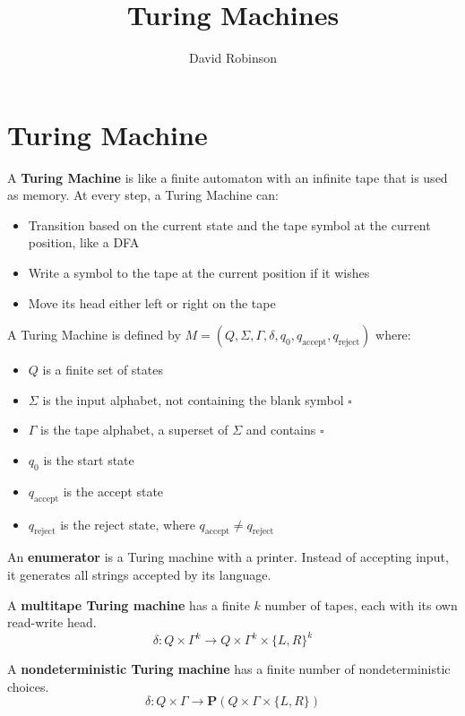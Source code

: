 \documentclass{article}
\title{Turing Machines}
\author{David Robinson}
\date{}
\begin{document}
\maketitle

\section*{Turing Machine}

A \textbf{Turing Machine} is like a finite automaton with an infinite tape that is used as memory. At every step, a Turing Machine can:
\begin{itemize}
    \item Transition based on the current state and the tape symbol at the current position, like a DFA
    \item Write a symbol to the tape at the current position if it wishes
    \item Move its head either left or right on the tape
\end{itemize}

A Turing Machine is defined by $M=(Q,\Sigma,\Gamma,\delta,q_0, q_\text{accept}, q_\text{reject})$ where:
\begin{itemize}
    \item $Q$ is a finite set of states
    \item $\Sigma$ is the input alphabet, not containing the blank symbol $\square$
    \item $\Gamma$ is the tape alphabet, a superset of $\Sigma$ and contains $\square$
    \item $q_0$ is the start state
    \item $q_\text{accept}$ is the accept state
    \item $q_\text{reject}$ is the reject state, where $q_\text{accept}\neq q_\text{reject}$
\end{itemize}

An \textbf{enumerator} is a Turing machine with a printer. Instead of accepting input, it generates all strings accepted by its language.
\vspace{1em}

A \textbf{multitape Turing machine} has a finite $k$ number of tapes, each with its own read-write head.
\[\delta: Q\times\Gamma^k\rightarrow Q\times\Gamma^k\times{\{L, R\}}^k\]
\vspace{1em}

A \textbf{nondeterministic Turing machine} has a finite number of nondeterministic choices.
\[\delta: Q\times\Gamma\rightarrow\mathbf{P}(Q\times\Gamma\times\{L,R\})\]
\end{document}
